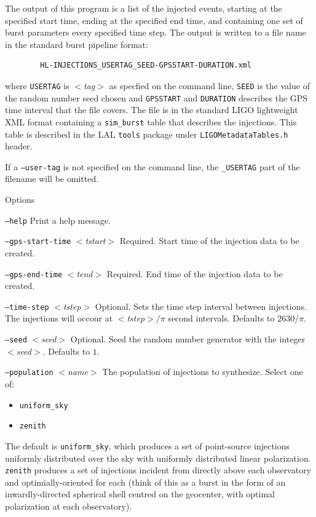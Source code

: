 \documentclass{article}
\newcommand{\option}[1]{\texttt{#1}}
\newcommand{\parm}[1]{$<$\textit{#1}$>$}
\newenvironment{entry}%
  {\begin{list}{}{\renewcommand{\makelabel}[1]%
    {\parbox[b]{\labelwidth}{\makebox[0pt][l]{\textbf{##1}}\\}}%
    \setlength{\labelwidth}{1em}%
    \setlength{\labelsep}{1em}%
    \setlength{\leftmargin}{2em}%
    \setlength{\topsep}{\medskipamount}%
    \setlength{\itemsep}{\medskipamount}%
    \setlength{\parsep}{\medskipamount}%
    \setlength{\listparindent}{0pt}}}
  {\end{list}}
\begin{document}
\begin{entry}
The output of this program  is  a  list  of  the  injected events, starting
at  the specified start time, ending at the specified end time, and
containing one set  of burst parameters every specified time step.  The
output is written to a file name in the standard burst pipeline format:
\begin{center}
\begin{verbatim}
        HL-INJECTIONS_USERTAG_SEED-GPSSTART-DURATION.xml
\end{verbatim}
\end{center}
where \verb$USERTAG$ is \parm{tag} as specfied on the command line,
\verb$SEED$ is the  value  of  the random number seed chosen and
\verb$GPSSTART$ and \verb$DURATION$ describes the GPS time interval that
the file covers. The file is in the standard LIGO lightweight XML format
containing a \texttt{sim\_burst} table that describes the injections.  This
table is described in the LAL \texttt{tools} package under
\texttt{LIGOMetadataTables.h} header.  

If a \option{--user-tag} is not specified on the command line, the
\texttt{\_USERTAG} part of the filename will be omitted.

\item[Options]\leavevmode
\begin{entry}
\item[\option{--help}] Print a help message.

\item[\option{--gps-start-time} \parm{tstart}]
Required.  Start time of the injection data to be created.

\item[\option{--gps-end-time} \parm{tend}]
Required.  End time of the injection data to be created.

\item[\option{--time-step} \parm{tstep}]
Optional. Sets the time step interval between injections. The injections
will occour at \parm{tstep}$/\pi$ second intervals. Defaults to $2630/\pi$.

\item[\option{--seed} \parm{seed}]
Optional. Seed the random number generator with the integer \parm{seed}.
Defaults to $1$.

\item[\option{--population} \parm{name}]
The population of injections to synthesize.  Select one of:
\begin{itemize}
\item \texttt{uniform\_sky}
\item \texttt{zenith}
\end{itemize}
The default is \texttt{uniform\_sky}, which produces a set of point-source
injections uniformly distributed over the sky with uniformly distributed
linear polarization.  \texttt{zenith} produces a set of injections incident
from directly above each observatory and optimially-oriented for each
(think of this as a burst in the form of an inwardly-directed spherical
shell centred on the geocenter, with optimal polarization at each
observatory).


\end{entry}
\end{entry}
\end{document}
